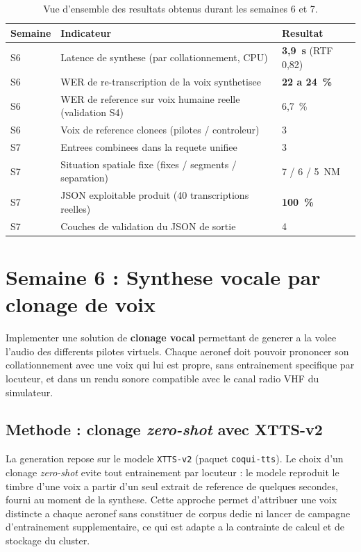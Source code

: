 \documentclass[11pt,a4paper]{article}
\begin{document}
\begin{table}[h]
\centering
\small
\begin{tabular}{>{\raggedright}p{1.6cm} >{\raggedright}p{8.1cm} l}
\toprule
\rowcolor{lightgray}\textbf{Semaine} & \textbf{Indicateur} & \textbf{Resultat}\\
\midrule
S6 & Latence de synthese (par collationnement, CPU) & \textbf{3,9~s} (RTF 0,82)\\
S6 & WER de re-transcription de la voix synthetisee & \textbf{22 a 24~\%}\\
S6 & WER de reference sur voix humaine reelle (validation S4) & 6,7~\%\\
S6 & Voix de reference clonees (pilotes / controleur) & 3\\
S7 & Entrees combinees dans la requete unifiee & 3\\
S7 & Situation spatiale fixe (fixes / segments / separation) & 7 / 6 / 5~NM\\
S7 & JSON exploitable produit (40 transcriptions reelles) & \textbf{100~\%}\\
S7 & Couches de validation du JSON de sortie & 4\\
\bottomrule
\end{tabular}
\caption{Vue d'ensemble des resultats obtenus durant les semaines 6 et 7.}
\end{table}

\section{Semaine 6 : Synthese vocale par clonage de voix}

\begin{objbox}
Implementer une solution de \textbf{clonage vocal} permettant de generer a la volee
l'audio des differents pilotes virtuels. Chaque aeronef doit pouvoir prononcer son
collationnement avec une voix qui lui est propre, sans entrainement specifique par
locuteur, et dans un rendu sonore compatible avec le canal radio VHF du simulateur.
\end{objbox}

\subsection{Methode : clonage \emph{zero-shot} avec XTTS-v2}

La generation repose sur le modele \texttt{XTTS-v2} (paquet \texttt{coqui-tts}). Le
choix d'un clonage \emph{zero-shot} evite tout entrainement par locuteur : le modele
reproduit le timbre d'une voix a partir d'un seul extrait de reference de quelques
secondes, fourni au moment de la synthese. Cette approche permet d'attribuer une voix
distincte a chaque aeronef sans constituer de corpus dedie ni lancer de campagne
d'entrainement supplementaire, ce qui est adapte a la contrainte de calcul et de
stockage du cluster.
\end{document}
